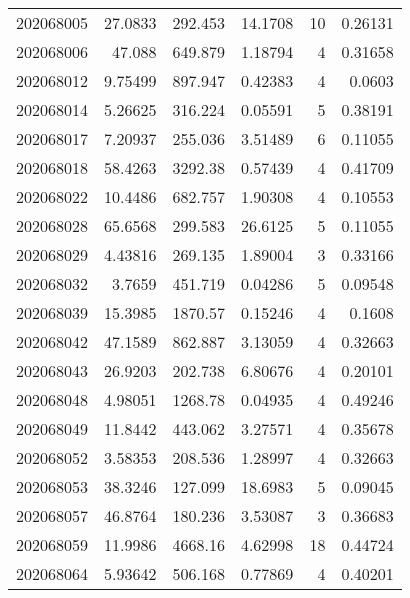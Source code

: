 \begin{tabular}{rrrrrr}
 202068005 &         27.0833  &      292.453  &           14.1708  &          10 & 0.26131 \\
 202068006 &         47.088   &      649.879  &            1.18794 &           4 & 0.31658 \\
 202068012 &          9.75499 &      897.947  &            0.42383 &           4 & 0.0603  \\
 202068014 &          5.26625 &      316.224  &            0.05591 &           5 & 0.38191 \\
 202068017 &          7.20937 &      255.036  &            3.51489 &           6 & 0.11055 \\
 202068018 &         58.4263  &     3292.38   &            0.57439 &           4 & 0.41709 \\
 202068022 &         10.4486  &      682.757  &            1.90308 &           4 & 0.10553 \\
 202068028 &         65.6568  &      299.583  &           26.6125  &           5 & 0.11055 \\
 202068029 &          4.43816 &      269.135  &            1.89004 &           3 & 0.33166 \\
 202068032 &          3.7659  &      451.719  &            0.04286 &           5 & 0.09548 \\
 202068039 &         15.3985  &     1870.57   &            0.15246 &           4 & 0.1608  \\
 202068042 &         47.1589  &      862.887  &            3.13059 &           4 & 0.32663 \\
 202068043 &         26.9203  &      202.738  &            6.80676 &           4 & 0.20101 \\
 202068048 &          4.98051 &     1268.78   &            0.04935 &           4 & 0.49246 \\
 202068049 &         11.8442  &      443.062  &            3.27571 &           4 & 0.35678 \\
 202068052 &          3.58353 &      208.536  &            1.28997 &           4 & 0.32663 \\
 202068053 &         38.3246  &      127.099  &           18.6983  &           5 & 0.09045 \\
 202068057 &         46.8764  &      180.236  &            3.53087 &           3 & 0.36683 \\
 202068059 &         11.9986  &     4668.16   &            4.62998 &          18 & 0.44724 \\
 202068064 &          5.93642 &      506.168  &            0.77869 &           4 & 0.40201 \\

\end{tabular}
